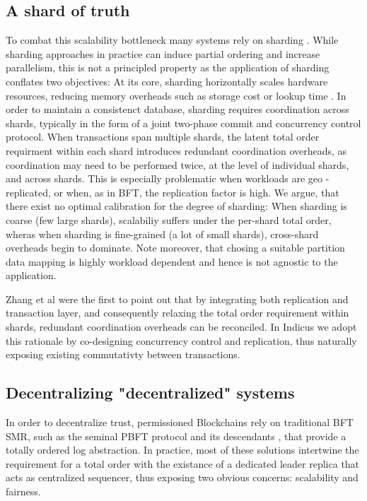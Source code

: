 \subsection{A shard of truth}
To combat this scalability bottleneck many systems rely on sharding \cite{al2017chainspace,kokoris2018omniledger, zamani2018rapidchain}. While sharding approaches in practice  can induce partial ordering and increase parallelism, this is not a principled property as the application of sharding conflates two objectives:
At its core, sharding horizontally scales hardware resources, reducing memory overheads such as storage cost or lookup time . In order to maintain a consistenct database, sharding requires coordination across shards, typically in the form of a joint two-phase commit and concurrency control protocol. When transactions span multiple shards, the latent total order requirment within each shard introduces redundant coordination overheads, as coordination may need to be performed twice, at the level of individual shards, and across shards. This is especially problematic when workloads are geo
-replicated, or when, as in BFT, the replication factor is high. 
We argue, that there exist no optimal calibration for the degree of sharding: When sharding is coarse (few large shards), scalabiliy suffers under the per-shard total order, wheras when sharding is fine-grained (a lot of small shards), cross-shard overheads begin to dominate. 
Note moreover, that chosing a suitable partition data mapping is highly workload dependent and hence  is not agnostic to the application.

Zhang et al \cite{zhang2016operation, zhang2015tapir} were the first to point out that by integrating both replication and transaction layer, and consequently relaxing the total order requirement within shards, redundant coordination overheads can be reconciled.
In Indicus we adopt this rationale by co-designing concurrency control and replication, thus naturally exposing existing commutativty between transactions.



\subsection{Decentralizing "decentralized" systems}
In order to decentralize trust, permissioned Blockchains rely on traditional BFT SMR, such as the seminal PBFT protocol \cite{castro1999practical} and its descendants \cite{castro1999practical, kotla2007zyzzyva,  gueta2018sbft, clement2009making, buchman2016tendermint, yin2019hotstuff}, that provide a totally ordered log abstraction.
In practice, most of these solutions intertwine the requirement for a total order with the existance of a dedicated leader replica that acts as centralized sequencer, thus exposing two obvious concerns: scalability and fairness.

